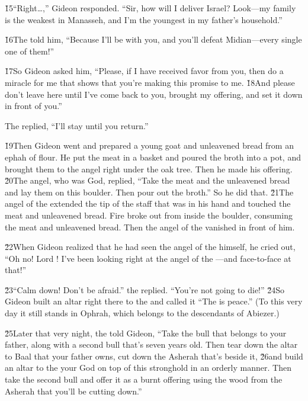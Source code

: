 \v{15}``Right{\ldots},'' Gideon responded. ``Sir, how will I deliver Israel? Look---my family is the weakest in Manasseh, and I'm the youngest in my father's household.''

\v{16}The  told him, ``Because I'll be with you, and you'll defeat Midian---every single one of them!''

\v{17}So Gideon asked him, ``Please, if I have received favor from you, then do a miracle for me that shows that you're making this promise to me. \v{18}And please don't leave here until I've come back to you, brought my offering, and set it down in front of you.''

The  replied, ``I'll stay until you return.''

\v{19}Then Gideon went and prepared a young goat and unleavened bread from an ephah of flour. He put the meat in a basket and poured the broth into a pot, and brought them to the angel right under the oak tree. Then he made his offering. \v{20}The angel, who was God, replied, ``Take the meat and the unleavened bread and lay them on this boulder. Then pour out the broth.'' So he did that. \v{21}The angel of the  extended the tip of the staff that was in his hand and touched the meat and unleavened bread. Fire broke out from inside the boulder, consuming the meat and unleavened bread. Then the angel of the  vanished in front of him.

\v{22}When Gideon realized that he had seen the angel of the  himself, he cried out, ``Oh no! Lord ! I've been looking right at the angel of the ---and face-to-face at that!''

\v{23}``Calm down! Don't be afraid.'' the  replied. ``You're not going to die!'' \v{24}So Gideon built an altar right there to the  and called it ``The  is peace.'' (To this very day it still stands in Ophrah, which belongs to the descendants of Abiezer.)

\v{25}Later that very night, the  told Gideon, ``Take the bull that belongs to your father, along with a second bull that's seven years old. Then tear down the altar to Baal that your father owns, cut down the Asherah that's beside it, \v{26}and build an altar to the  your God on top of this stronghold in an orderly manner. Then take the second bull and offer it as a burnt offering using the wood from the Asherah that you'll be cutting down.''

